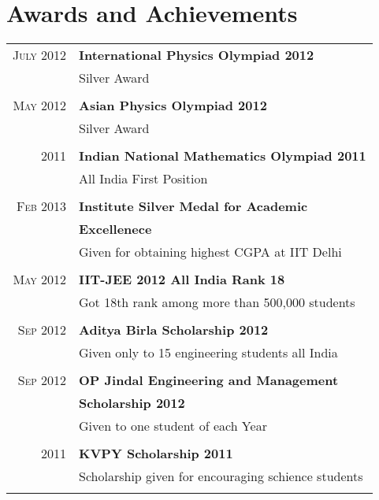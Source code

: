 \documentclass[10pt]{article} %
\begin{document}
{\begin{minipage}[t]{0.5\textwidth}
\section{Awards and Achievements} 
\begin{tabular}{rl}
\textsc{July 2012} & \textbf{International Physics Olympiad 2012}\\
& Silver Award\\\\
\textsc{May 2012} & \textbf{Asian Physics Olympiad 2012}\\
& Silver Award\\\\
\textsc{2011} & \textbf{Indian National Mathematics Olympiad 2011}\\
& All India First Position \\\\
\textsc{Feb 2013} & \textbf{Institute Silver Medal for Academic}\\ &  {\bf Excellenece }\\
& Given for obtaining highest CGPA at IIT Delhi\\\\
\textsc{May 2012} & \textbf{IIT-JEE 2012 All India Rank 18}\\
& Got 18th rank among more than 500,000 students\\\\
\textsc{Sep 2012} & \textbf{Aditya Birla Scholarship 2012}\\
& Given only to 15 engineering students all India\\\\
\textsc{Sep 2012} & \textbf{OP Jindal Engineering and Management }\\ & \textbf{ Scholarship 2012}\\
& Given to one student of each Year\\\\
\textsc{2011} & \textbf{KVPY Scholarship 2011}\\
& Scholarship given for encouraging schience students \\\\
\end{tabular}\\[10pt]

\end{minipage} %
\hfill
\begin{minipage}[t]{0.44\textwidth} %
\vspace{0pt} %


\end{minipage}}
\end{document}
